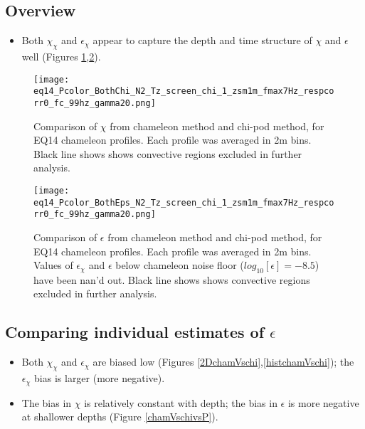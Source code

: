 \documentclass[11pt]{article}
\begin{document}
\subsection{Overview}



\begin{itemize}

\item Both $\chi_{\chi}$ and $\epsilon_{\chi}$ appear to capture the depth and time structure of $\chi$ and $\epsilon$ well (Figures \ref{chi_overview},\ref{eps_overview}).


\end{itemize}



\begin{figure}[htbp]
\texttt{[image: eq14\_Pcolor\_BothChi\_N2\_Tz\_screen\_chi\_1\_zsm1m\_fmax7Hz\_respcorr0\_fc\_99hz\_gamma20.png]}
\caption{Comparison of $\chi$ from chameleon method and chi-pod method, for EQ14 chameleon profiles. Each profile was averaged in 2m bins.  Black line shows shows convective regions excluded in further analysis.}
\label{chi_overview}
\end{figure}

\begin{figure}[htbp]
\texttt{[image: eq14\_Pcolor\_BothEps\_N2\_Tz\_screen\_chi\_1\_zsm1m\_fmax7Hz\_respcorr0\_fc\_99hz\_gamma20.png]}
\caption{Comparison of $\epsilon$ from chameleon method and chi-pod method, for EQ14 chameleon profiles. Each profile was averaged in 2m bins.  Values of $\epsilon_{\chi}$ and $\epsilon$ below chameleon noise floor ($log_{10}[\epsilon]=-8.5$) have been nan'd out. Black line shows shows convective regions excluded in further analysis.}
\label{eps_overview}
\end{figure}




\clearpage
\subsection{Comparing individual estimates of $\epsilon$}

\begin{itemize}

\item Both $\chi_{\chi}$ and $\epsilon_{\chi}$ are biased low (Figures \ref{2DchamVschi},\ref{histchamVschi}); the $\epsilon_{\chi}$ bias is larger (more negative).

\item The bias in $\chi$ is relatively constant with depth; the bias in $\epsilon$ is more negative at shallower depths (Figure \ref{chamVschivsP}).

\end{itemize}
\end{document}
